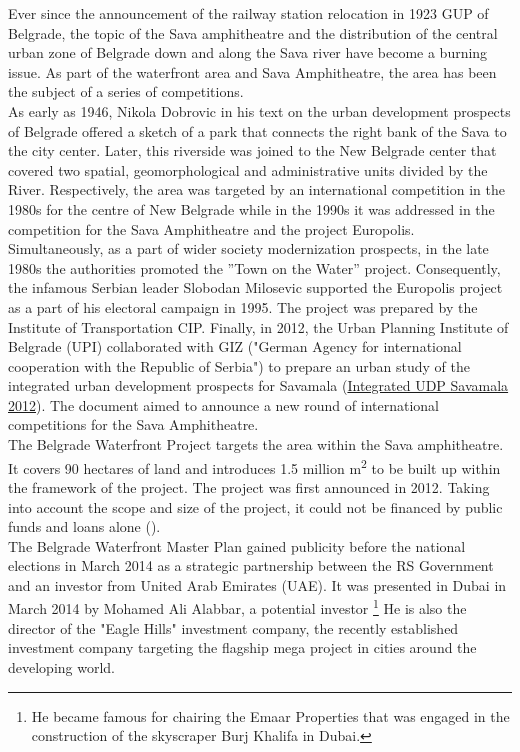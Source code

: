 \documentclass[11pt]{report}
\begin{document}
\begin{itemize}
Ever since the announcement of the railway station relocation in 1923 GUP of Belgrade, the topic of the Sava amphitheatre and the distribution of the central urban zone of Belgrade down and along the Sava river have become a burning issue. As part of the waterfront area and Sava Amphitheatre, the area has been the subject of a series of competitions.
\\
As early as 1946, Nikola Dobrovic in his text on the urban development prospects of Belgrade offered a sketch of a park that connects the right bank of the Sava to the city center. Later, this riverside was joined to the New Belgrade center that covered two spatial, geomorphological and administrative units divided by the River. Respectively, the area was targeted by an international competition in the 1980s for the centre of New Belgrade while in the 1990s it was addressed in the competition for the Sava Amphitheatre and the project Europolis.
\\

Simultaneously, as a part of wider society modernization prospects, in the late 1980s the authorities promoted the ”Town on the Water” project. Consequently, the infamous Serbian leader Slobodan Milosevic supported the Europolis project as a part of his electoral campaign in 1995. The project was prepared by the Institute of Transportation CIP. Finally, in 2012, the Urban Planning Institute of Belgrade (UPI) collaborated with GIZ ("German Agency for international cooperation with the Republic of Serbia") to prepare an urban study of the integrated urban development prospects for Savamala (\href{Integrated UDP Savamala 2012}{Integrated UDP Savamala 2012}).
The document aimed to announce a new round of international competitions for the Sava Amphitheatre.
\\

The Belgrade Waterfront Project targets the area within the Sava amphitheatre. It covers 90 hectares of land and introduces 1.5 million m\textsuperscript{2}  to be built up within the framework of the project. The project was first announced in 2012. Taking into account the scope and size of the project, it could not be financed by public funds and loans alone (\href{Vukmirovic}{\citealt{doytchinov_belgrade:_2015}}).
\\

The Belgrade  Waterfront Master Plan gained publicity before the national elections in March 2014 as a strategic partnership between the RS Government and an investor from United Arab Emirates (UAE).
It was presented in Dubai in March 2014 by  Mohamed Ali Alabbar, a potential investor
\footnote{He became famous for chairing the Emaar Properties that was engaged in the construction of the  skyscraper Burj Khalifa in Dubai.}
He is also the  director  of the  "Eagle Hills" investment company, the recently established investment company targeting the  flagship mega project in cities around the developing world.
\\


\end{itemize}
\end{document}
